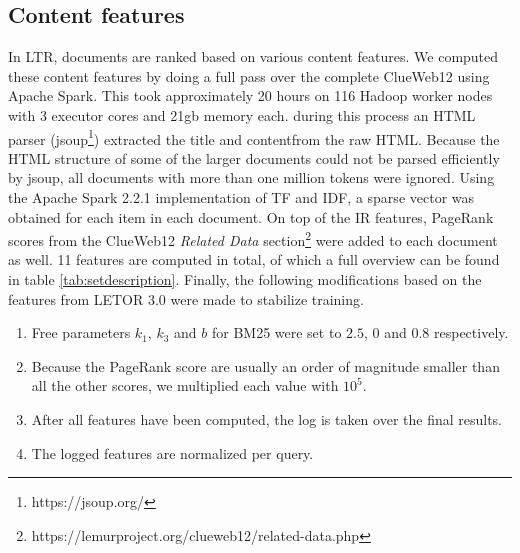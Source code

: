 \subsection{Content features} \label{sec:contentfeature}
In LTR, documents are ranked based on various content features. We computed these content features by doing a full pass over the complete ClueWeb12 using Apache Spark. This took approximately 20 hours on 116 Hadoop worker nodes with 3 executor cores and 21gb memory each. during this process an HTML parser (jsoup\footnote{https://jsoup.org/}) extracted the title and contentfrom the raw HTML. Because the HTML structure of some of the larger documents could not be parsed efficiently by jsoup, all documents with more than one million tokens were ignored. Using the Apache Spark 2.2.1 implementation of TF and IDF, a sparse vector was obtained for each item in each document.  On top of the IR features, PageRank scores from the ClueWeb12 \textit{Related Data} section\footnote{https://lemurproject.org/clueweb12/related-data.php} were added to each document as well. 11 features are computed in total, of which a full overview can be found in table \ref{tab:setdescription}. Finally, the following modifications based on the features from LETOR 3.0 \cite{qin2010letor} were made to stabilize training.
\begin{enumerate}  
\item Free parameters $k_1$, $k_3$ and $b$ for BM25 were set to $2.5$, $0$ and $0.8$ respectively. 
\item Because the PageRank score are usually an order of magnitude smaller than all the other scores, we multiplied each value with $10^5$.
\item After all features have been computed, the log is taken over the final results.
\item The logged features are normalized per query.  
\end{enumerate}


